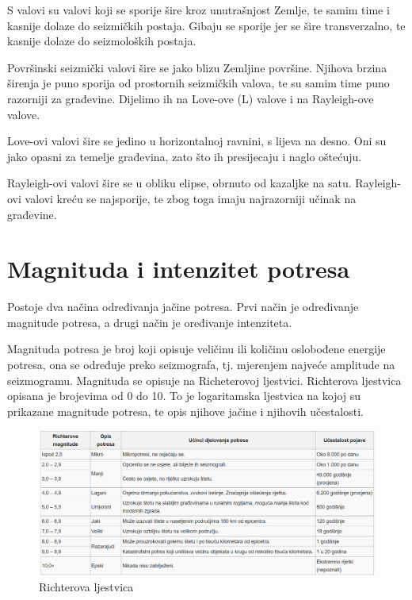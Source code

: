 \documentclass[12pt]{book}
\begin{document}
S valovi su valovi koji se sporije šire kroz unutrašnjost Zemlje, te samim time i kasnije dolaze do seizmičkih postaja. Gibaju se sporije jer se šire transverzalno, te kasnije dolaze do seizmoloških postaja.

Površinski seizmički valovi šire se jako blizu Zemljine površine. Njihova brzina širenja je puno sporija od prostornih seizmičkih valova, te su samim time puno razorniji za građevine. Dijelimo ih na Love-ove (L) valove i na Rayleigh-ove valove. 

Love-ovi valovi šire se jedino u horizontalnoj ravnini, s lijeva na desno. Oni su jako opasni za temelje građevina, zato što ih presijecaju i naglo oštećuju.

Rayleigh-ovi valovi šire se u obliku elipse, obrnuto od kazaljke na satu. Rayleigh-ovi valovi kreću se najsporije, te zbog toga imaju najrazorniji učinak na građevine. \cite{herak1984} \cite{oluic2015} \cite{jagodnik_potresi}

\section{Magnituda i intenzitet potresa}

Postoje dva načina određivanja jačine potresa. Prvi način je određivanje magnitude potresa, a drugi način je oređivanje intenziteta.

Magnituda potresa je broj koji opisuje veličinu ili količinu oslobođene energije potresa, ona se određuje preko seizmografa, tj. mjerenjem najveće amplitude na seizmogramu. Magnituda se opisuje na Richeterovoj ljestvici. Richterova ljestvica opisana je brojevima od 0 do 10. To je logaritamska ljestvica na kojoj su prikazane magnitude potresa, te opis njihove jačine i njihovih učestalosti. \cite{richterova_vjesnik}

\begin{figure}[H]
	\centering
	\includegraphics[width=1\linewidth]{Slike/richterova}
	\caption{Richterova ljestvica \cite{richterova_slika}}
	\label{fig:richterova}
\end{figure}
\end{document}
